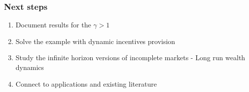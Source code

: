 \documentclass{beamer}
\theoremstyle{definition}
\begin{document}
\begin{frame}
\frametitle{Next steps}
\begin{enumerate}
\item Document results for the $\gamma > 1$  
\item Solve the example with dynamic incentives provision
\item Study the infinite horizon versions of incomplete markets - Long run wealth dynamics	
\item Connect to applications and existing literature
\end{enumerate}
\end{frame}
\end{document}
